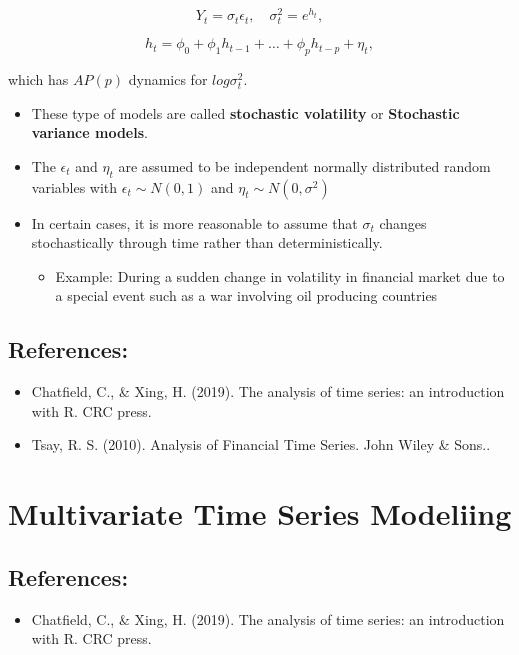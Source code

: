 \documentclass[]{book}
\providecommand{\tightlist}{%
  \setlength{\itemsep}{0pt}\setlength{\parskip}{0pt}}
\begin{document}
\[Y_t=\sigma_t\epsilon_t, \quad \sigma_t^2=e^{h_t},\]

\[h_t=\phi_0+\phi_1h_{t-1}+\dots+\phi_ph_{t-p}+\eta_t,\]

which has \(AP(p)\) dynamics for \(log\sigma_t^2.\)

\begin{itemize}
\tightlist
\item
  These type of models are called \textbf{stochastic volatility} or \textbf{Stochastic variance models}.
\item
  The \(\epsilon_t\) and \(\eta_t\) are assumed to be independent normally distributed random variables with \(\epsilon_t\sim N(0,1)\) and \(\eta_t\sim N(0,\sigma^2)\)
\item
  In certain cases, it is more reasonable to assume that \(\sigma_t\) changes stochastically through time rather than deterministically.

  \begin{itemize}
  \tightlist
  \item
    Example: During a sudden change in volatility in financial market due to a special event such as a war involving oil producing countries
  \end{itemize}
\end{itemize}

\hypertarget{references-2}{%
\section{References:}\label{references-2}}

\begin{itemize}
\item
  Chatfield, C., \& Xing, H. (2019). The analysis of time series: an introduction with R. CRC press.
\item
  Tsay, R. S. (2010). Analysis of Financial Time Series. John Wiley \& Sons..
  \newpage
\end{itemize}

\hypertarget{multivariate-time-series-modeliing}{%
\chapter{Multivariate Time Series Modeliing}\label{multivariate-time-series-modeliing}}


\hypertarget{references-3}{%
\section{References:}\label{references-3}}

\begin{itemize}
\tightlist
\item
  Chatfield, C., \& Xing, H. (2019). The analysis of time series: an introduction with R. CRC press.
\end{itemize}


\end{document}
